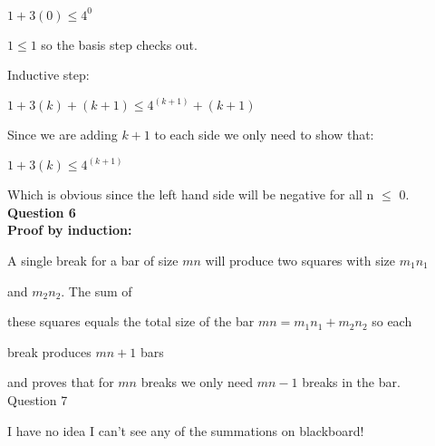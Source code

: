\documentclass[12]{article}
\begin{document}
$1+3(0) \leq 4^0$

$1 \leq 1$ so the basis step checks out.

Inductive step:

$1 + 3(k)+(k+1) \leq 4^{(k+1)}+(k+1)$

Since we are adding $k+1$ to each side we only need to show that:

$1+3(k) \leq 4^{(k+1)}$

Which is obvious since the left hand side will be negative for all n $\leq$ 0.\\ 
\newpage
\textbf{Question 6}\\

\textbf{Proof by induction:}

A single break for a bar of size $mn$ will produce two squares with size $m_1n_1$ 

and $m_2n_2$.  The sum of 

these squares equals the total size of the bar $mn = m_1n_1 + m_2n_2$ so each 

break produces $mn+1$ bars 

and proves that for $mn$ breaks we only need $mn-1$ breaks in the bar.\\

Question 7

I have no idea I can't see any of the summations on blackboard!
\end{document}
